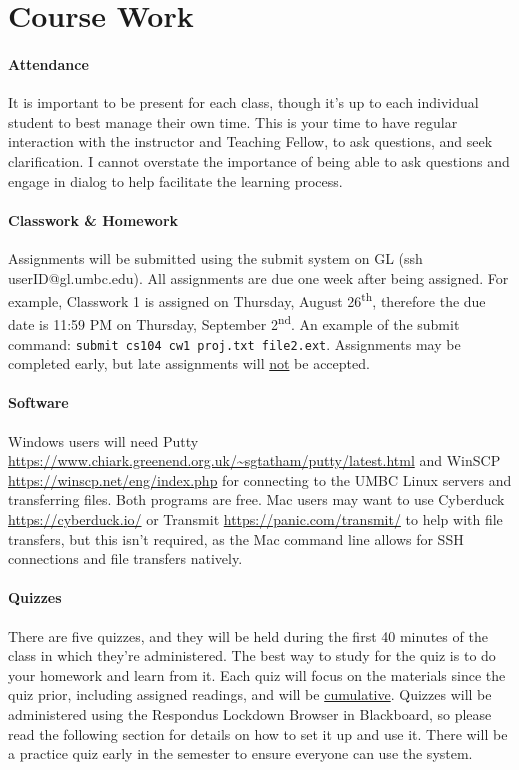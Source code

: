 \documentclass[letter,11pt]{article}
\begin{document}
\section*{Course Work}
\paragraph{Attendance}It is important to be present for each class, though it's up to each individual student to best manage their own time. This is your time to have regular interaction with the instructor and Teaching Fellow, to ask questions, and seek clarification. I cannot overstate the importance of being able to ask questions and engage in dialog to help facilitate the learning process.

\paragraph{Classwork \& Homework}Assignments will be submitted using the submit system on GL (ssh userID@gl.umbc.edu). All assignments are due one week after being assigned. For example, Classwork 1 is assigned on Thursday, August 26\textsuperscript{th}, therefore the due date is 11:59 PM on Thursday, September 2\textsuperscript{nd}. An example of the submit command: \texttt{submit cs104 cw1 proj.txt file2.ext}. Assignments may be completed early, but late assignments will \underline{not} be accepted.

\paragraph{Software} Windows users will need Putty \url{https://www.chiark.greenend.org.uk/~sgtatham/putty/latest.html} and WinSCP \url{https://winscp.net/eng/index.php} for connecting to the UMBC Linux servers and transferring files. Both programs are free. Mac users may want to use Cyberduck \url{https://cyberduck.io/} or Transmit \url{https://panic.com/transmit/} to help with file transfers, but this isn't required, as the Mac command line allows for SSH connections and file transfers natively.

\paragraph{Quizzes}There are five quizzes, and they will be held during the first 40 minutes of the class in which they're administered. The best way to study for the quiz is to do your homework and learn from it. Each quiz will focus on the materials since the quiz prior, including assigned readings, and will be \underline{cumulative}. Quizzes will be administered using the Respondus Lockdown Browser in Blackboard, so please read the following section for details on how to set it up and use it. There will be a practice quiz early in the semester to ensure everyone can use the system.
\end{document}
